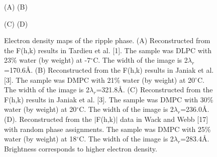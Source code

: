 \begin{figure}
\begin{center}
\leavevmode
\raggedleft
\hspace{0.5in}
\leavevmode
\raggedright
\hspace{0.5in}
\end{center}
\vspace{-0.2in}
\hspace{1.5in} (A) \hspace{2.9in} (B)
\begin{center}
\leavevmode
\raggedleft
\hspace{0.5in}
\leavevmode
\raggedright
\hspace{0.5in}
\end{center}
\vspace{-0.2in}
\hspace{1.5in} (C) \hspace{2.9in} (D)
\vspace{0.2in}
\caption{Electron density maps of the ripple phase. (A) Reconstructed
from the F(h,k) results in Tardieu et al. [1]. The sample was DLPC with 23\%
water (by weight) at -7$^{\circ}$C. The width of the image is 
2$\lambda_r$=170.6\AA. (B) Reconstructed from the F(h,k) results in Janiak et 
al. [3]. The sample was DMPC with 21\% water (by weight) at 20$^{\circ}$C. 
The width of the image is 2$\lambda_r$=321.8\AA. (C) Reconstructed from the 
F(h,k) results in Janiak et al. [3]. The sample was DMPC with 30\% water 
(by weight) at 20$^{\circ}$C. The width of the image is 2$\lambda_r$=236.0\AA. 
(D). Reconstructed from the $|$F(h,k)$|$ data in Wack and Webb [17] with random 
phase assignments. The sample was DMPC with 25\% water (by weight) at 
18$^{\circ}$C. The width of the image is 2$\lambda_r$=283.4\AA. Brightness 
corresponds to higher electron density.
\label{others}}
\end{figure}
